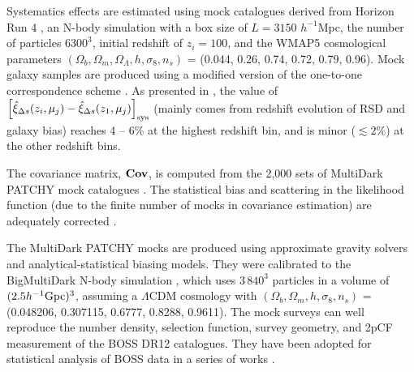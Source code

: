 \documentclass[iop]{emulateapj}
\begin{document}
Systematics effects are estimated using mock catalogues derived from Horizon Run 4 \citep[HR4;][]{HR4},
an N-body simulation with a box size of $L={3150}$ $h^{-1}$Mpc, the number of particles $6300^3$,   
initial redshift of $z_{i}=100$, and the WMAP5\citep{komatsu2011} cosmological parameters 
$(\Omega_{b},\Omega_{m},\Omega_\Lambda,h,\sigma_8,n_s)$  = (0.044, 0.26, 0.74, 0.72, 0.79, 0.96). 
Mock galaxy samples are produced using a modified version of the one-to-one correspondence scheme \citep{hong2016}. 
As presented in \cite{Li2016}, the value of $\left[\hat\xi_{\Delta s}(z_i,\mu_j)-\hat\xi_{\Delta s}(z_1,\mu_j)\right]_{\rm sys}$
(mainly comes from redshift evolution of RSD and galaxy bias)
reaches 4 -- 6\% at the highest redshift bin,
and is minor ($\lesssim2\%$) at the other redshift bins.


The covariance matrix, ${\bf Cov}$, is computed from the 2,000 sets of MultiDark PATCHY mock catalogues \citep{MDPATCHY}.
The statistical bias and scattering in the likelihood function (due to the finite number of mocks in covariance estimation) 
are adequately corrected \citep{Hartlap,Percival2014}.

The MultiDark PATCHY  mocks are produced using approximate gravity solvers and analytical-statistical biasing models.
They were calibrated to the BigMultiDark N-body simulation \citep{K2014}, which 
uses $3\,840^3$ particles in a volume of $(2.5h^{-1}\rm Gpc)^3$,
assuming a $\Lambda$CDM cosmology with 
$(\Omega_{b},\Omega_{m},h,\sigma_8,n_s)$  = (0.048206, 0.307115, 0.6777, 0.8288, 0.9611). 
The mock surveys can well reproduce the number density, 
selection function, survey geometry, and 2pCF measurement of the BOSS DR12 catalogues.
They have been adopted for statistical analysis of BOSS data in a series of works \citep[see][and references therein]{Alam2016}.
\end{document}
